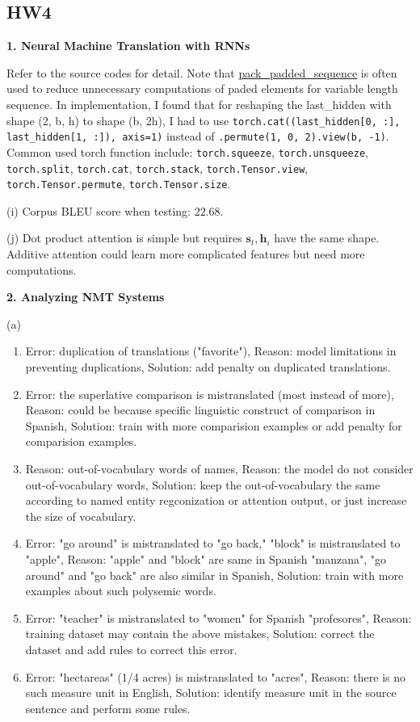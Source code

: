 \subsection{HW4}
\textbf{1. Neural Machine Translation with RNNs}

Refer to the source codes for detail.
Note that \href{https://stackoverflow.com/questions/51030782/why-do-we-pack-the-sequences-in-pytorch}{pack\_padded\_sequence} is often used to reduce unnecessary computations of paded elements for variable length sequence.
In implementation, I found that for reshaping the last\_hidden with shape (2, b, h) to shape (b, 2h), I had to use \texttt{torch.cat((last\_hidden[0, :], last\_hidden[1, :]), axis=1)} instead of \texttt{.permute(1, 0, 2).view(b, -1)}.
Common used torch function include: \texttt{torch.squeeze}, \texttt{torch.unsqueeze}, \texttt{torch.split}, \texttt{torch.cat}, \texttt{torch.stack}, \texttt{torch.Tensor.view}, \texttt{torch.Tensor.permute}, \texttt{torch.Tensor.size}.

(i) Corpus BLEU score when testing: $22.68$.

(j) Dot product attention is simple but requires $\bm{s}_t, \bm{h}_i$ have the same shape. Additive attention could learn more complicated features but need more computations. 

\textbf{2. Analyzing NMT Systems}

(a)
\begin{enumerate}[label=(\roman*)]
	\item Error: duplication of translations ("favorite"), Reason: model limitations in preventing duplications, Solution: add penalty on duplicated translations.
	\item Error: the superlative comparison is mistranslated (most instead of more), Reason: could be because specific linguistic construct of comparison in Spanish, Solution: train with more comparision examples or add penalty for comparision examples.
	\item Reason: out-of-vocabulary words of names, Reason: the model do not consider out-of-vocabulary words, Solution: keep the out-of-vocabulary the same according to named entity regconization or attention output, or just increase the size of vocabulary.
	\item Error: "go around" is mistranslated to "go back," "block" is mistranslated to "apple", Reason: "apple" and "block" are same in Spanish "manzana", "go around" and "go back" are also similar in Spanish, Solution: train with more examples about such polysemic words.
	\item Error: "teacher" is mistranslated to "women" for Spanish "profesores", Reason: training dataset may contain the above mistakes, Solution: correct the dataset and add rules to correct this error.
	\item Error: "hectareas" (1/4 acres) is mistranslated to "acres", Reason: there is no such measure unit in English, Solution: identify measure unit in the source sentence and perform some rules.
\end{enumerate}

